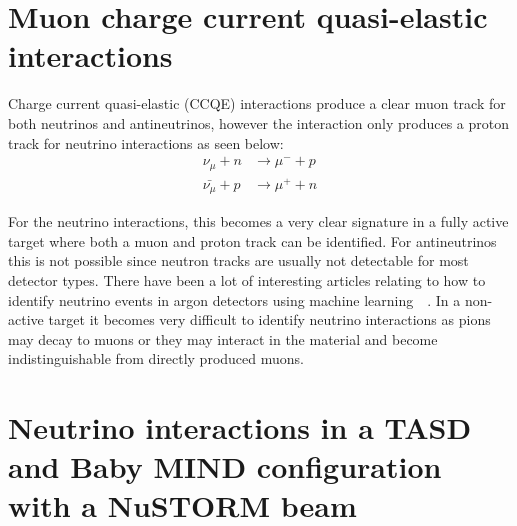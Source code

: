 \section{Muon charge current quasi-elastic interactions}

Charge current quasi-elastic (CCQE) interactions produce a clear muon track for both neutrinos and antineutrinos, however the interaction only produces a proton track for neutrino interactions as seen below:
\begin{align}
\nu_\mu + n &\rightarrow \mu^- + p\\
 \bar{\nu_\mu} + p &\rightarrow \mu^+ + n
\end{align}

For the neutrino interactions, this becomes a very clear signature in a fully active target where both a muon and proton track can be identified. For antineutrinos this is not possible since neutron tracks are usually not detectable for most detector types.
There have been a lot of interesting articles relating to how to identify neutrino events in argon detectors using machine learning~\cite{83Radovic2018}~\cite{84Adams}. In a non-active target it becomes very difficult to identify neutrino interactions as pions may decay to muons or they may interact in the material and become indistinguishable from directly produced muons.





\pagebreak
\section{Neutrino interactions in a TASD and Baby MIND configuration with a NuSTORM beam}

